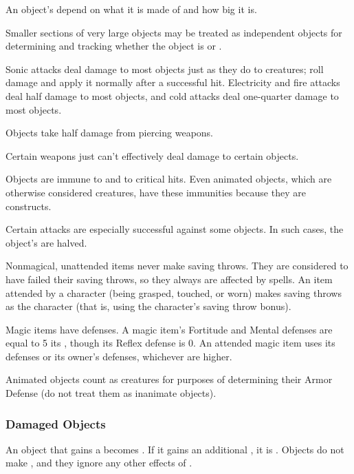              An object's  depend on what it is made of and how big it is.

            Smaller sections of very large objects may be treated as independent objects for determining  and tracking whether the object is  or .

             Sonic attacks deal damage to most objects just as they do to creatures; roll damage and apply it normally after a successful hit. Electricity and fire attacks deal half damage to most objects, and cold attacks deal one-quarter damage to most objects.

             Objects take half damage from piercing weapons.

             Certain weapons just can't effectively deal damage to certain objects.

             Objects are immune to  and to critical hits. Even animated objects, which are otherwise considered creatures, have these immunities because they are constructs.

             Certain attacks are especially successful against some objects. In such cases, the object's  are halved.

             Nonmagical, unattended items never make saving throws. They are considered to have failed their saving throws, so they always are affected by spells. An item attended by a character (being grasped, touched, or worn) makes saving throws as the character (that is, using the character's saving throw bonus).

            \par Magic items have defenses. A magic item's Fortitude and Mental defenses are equal to 5 \add its , though its Reflex defense is 0. An attended magic item uses its defenses or its owner's defenses, whichever are higher.

             Animated objects count as creatures for purposes of determining their Armor Defense (do not treat them as inanimate objects).

        \subsubsection{Damaged Objects}
            An object that gains a  becomes .
            If it gains an additional , it is .
            Objects do not make , and they ignore any other effects of .

